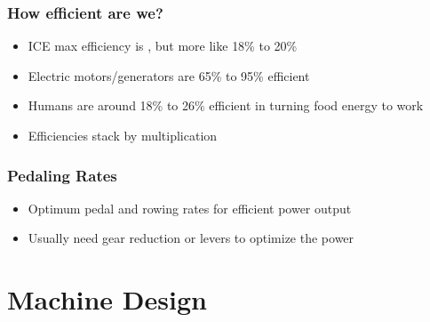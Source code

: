 \documentclass[]{beamer}
\begin{document}
\frame
{
    \frametitle{How efficient are we?}
    \begin{itemize}[<+->]
        \item ICE max efficiency is , but more like \alert{18\% to 20\%}
        \item Electric motors/generators are \alert{65\% to 95\%} efficient
        \item Humans are around \alert{18\% to 26\%} efficient in turning food energy to work
        \item Efficiencies stack by multiplication
    \end{itemize}
}
\frame
{
    \frametitle{Pedaling Rates}
    \begin{itemize}
        \item Optimum pedal and rowing rates for efficient power output
        \item Usually need gear reduction or levers to optimize the power
    \end{itemize}
}
\section{Machine Design}
\end{document}

